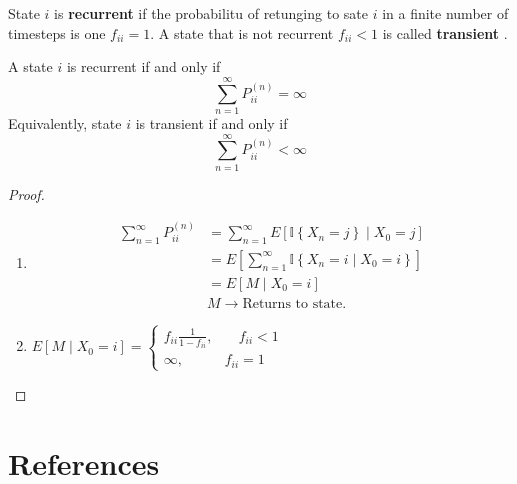 \documentclass{article}
\theoremstyle{remark}
\begin{document}
 \begin{definition}
   State $i$ is \textbf{recurrent}  if the probabilitu of retunging to sate $i$ in a finite number of timesteps is one $f_{ii} = 1$. A state that is not recurrent $f_{ii} < 1$ is called \textbf{transient} .
 \end{definition}

 \begin{theorem}
   A state $i$ is recurrent if and only if \[
   \sum_{n=1}^{\infty} P_{ii}^{(n)} = \infty
   \] 
   Equivalently, state $i$ is transient if and only if \[
   \sum_{n=1}^{\infty}  P^{(n)}_{ii} < \infty
   \] 
 \end{theorem}

 \begin{proof}
   \begin{enumerate}[label=(\roman*)]
     \item  \[
         \begin{split}
\sum_{n =1}^{\infty}  P _{ii}^{(n)}  & = \sum_{n= 1}^{\infty}  E\left[ \mathbb{I} \left\{ X_{n} = j \right\}  \mid  X_{0} = j \right]  \\
       & = E\left[ \sum_{n=1}^{ \infty}  \mathbb{I} \left\{ X_{n} = i  \mid  X_{0} = i \right\} \right] \\
       &= E\left[ M  \mid  X_{0} = i \right] \\
        & M \to  \text{Returns to state.}
         \end{split} 
     \] 
   \item $E \left[ M  \mid  X_{0} = i \right] = \begin{cases}
     f_{ii}\frac{1}{1- f_{ii}}  , &  \quad  f_{ii} < 1 \\
     \infty ,  &  f_{ii} = 1 
   \end{cases}$
   \end{enumerate}
 \end{proof}

\section{References}
\label{sec:references}





\end{document}
